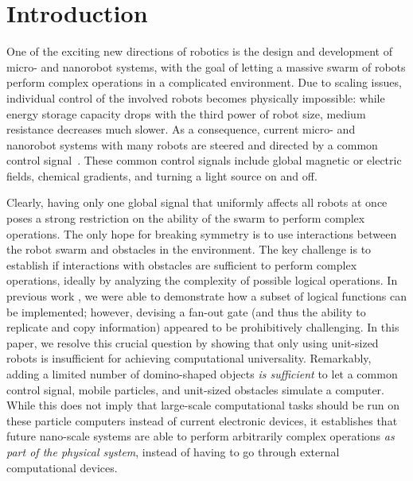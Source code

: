 \documentclass[letterpaper, 10 pt, conference]{ieeeconf}
\begin{document}

\section{Introduction}

One of the exciting new directions of robotics is the design and development
of micro- and nanorobot systems, with the goal of letting a massive swarm of robots
perform complex operations in a complicated environment. Due to scaling 
issues, individual control of the involved robots becomes physically impossible:
while energy storage capacity drops with the third power of robot size,
medium resistance decreases much slower. As a consequence,
current micro- and nanorobot systems with many robots are steered and
directed by a common control 
signal~\cite{Donald2013,Chiang2011,Hsi-Wen2012,Diller2013,Jing2013,Ou2013,Lanauze2013}.
These common control signals include global magnetic or electric fields,
chemical gradients, and turning a light source on and off.  

Clearly, having only one global signal that uniformly affects all robots at once
poses a strong restriction on the ability of the swarm to perform complex operations.
The only hope for breaking symmetry is to use interactions between the robot swarm
and obstacles in the environment. The key challenge is to establish
if interactions with obstacles are sufficient to perform complex operations, ideally by analyzing the complexity of possible logical operations.
 In previous work \cite{Becker2013f,Becker2014,Becker2014a},
we were able to demonstrate how a subset of logical functions can be implemented;
however, devising a fan-out gate (and thus the ability to replicate and copy information)
appeared to be prohibitively challenging. In this paper, we resolve this crucial question by
showing that only using unit-sized robots is insufficient for achieving computational
universality. Remarkably, adding a limited number of domino-shaped objects {\em is sufficient}
to let a common control signal, mobile particles, and unit-sized obstacles
simulate a computer. While this does not imply that large-scale computational 
tasks should be run on these particle computers instead of current electronic
devices, it establishes that future nano-scale systems are able to perform
arbitrarily complex operations {\em as part of the physical system}, instead
of having to go through external computational devices.
\end{document}

